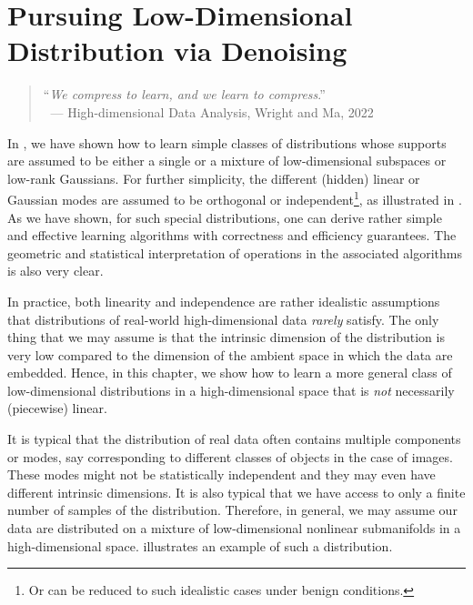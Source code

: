 \documentclass[../../book-main.tex]{subfiles}
\begin{document}
\chapter{Pursuing Low-Dimensional Distribution via Denoising}
\label{ch:general-distribution}\label{ch:denoising}\label{ch:compression}

\begin{quote}
	\hfill    ``{\em We compress to learn, and we learn to compress}.''\\
	$~$ \hfill --- High-dimensional Data Analysis, Wright and Ma, 2022
\end{quote}
\vspace{5mm}


In , we have shown how to learn simple classes of distributions whose supports are assumed to be either a single or a mixture of low-dimensional subspaces or low-rank Gaussians. For further simplicity, the different (hidden) linear or Gaussian modes are assumed to be orthogonal or independent\footnote{Or can be reduced to such idealistic cases under benign conditions.}, as illustrated in . As we have shown, for such special distributions, one can derive rather simple and effective learning algorithms with correctness and efficiency guarantees. The geometric and statistical interpretation of operations in the associated algorithms is also very clear.

In practice, both linearity and independence are rather idealistic assumptions that distributions of real-world high-dimensional data {\em rarely} satisfy. The only thing that we may assume is that the intrinsic dimension of the distribution is very low compared to the dimension of the ambient space in which the data are embedded. Hence, in this chapter, we show how to learn a more general class of low-dimensional distributions in a high-dimensional space that is {\em not} necessarily (piecewise) linear.

It is typical that the distribution of real data often contains multiple components or modes, say corresponding to different classes of objects in the case of images. These modes might not be statistically independent and they may even have different intrinsic dimensions. It is also typical that we have access to only a finite number of samples of the distribution. Therefore, in  general, we may assume our data are distributed on a mixture of low-dimensional nonlinear  submanifolds in a high-dimensional space.  illustrates an example of such a distribution.
\end{document}
